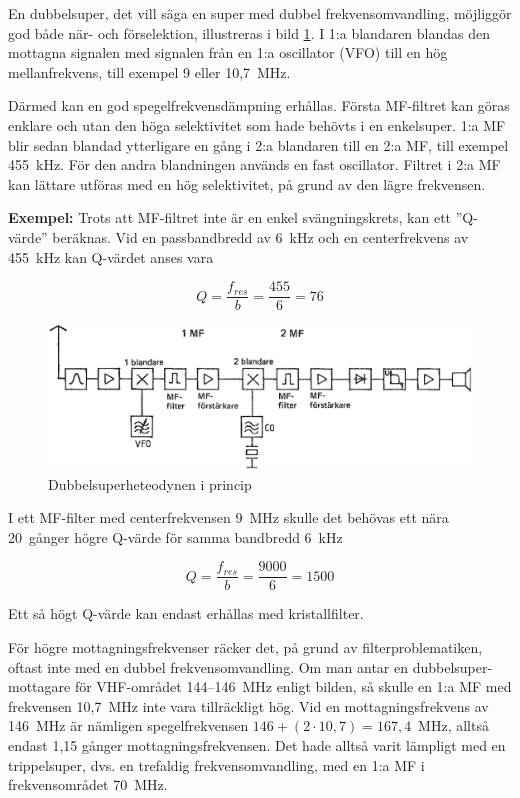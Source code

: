 En dubbelsuper, det vill säga en super med dubbel frekvensomvandling,
möjliggör god både när- och förselektion, illustreras i bild
\ref{fig:bildII4-14}.
I 1:a blandaren blandas den mottagna signalen med signalen från en
1:a oscillator (VFO) till en hög mellanfrekvens, till exempel 9 eller 10,7~MHz.

Därmed kan en god spegelfrekvensdämpning erhållas.
Första MF-filtret kan göras enklare och utan den höga selektivitet som hade
behövts i en enkelsuper.
1:a MF blir sedan blandad ytterligare en gång i 2:a blandaren till en 2:a MF,
till exempel 455~kHz.
För den andra blandningen används en fast oscillator.
Filtret i 2:a MF kan lättare utföras med en hög selektivitet, på grund av den
lägre frekvensen.

\textbf{Exempel:}
Trots att MF-filtret inte är en enkel svängningskrets, kan ett ''Q-värde''
beräknas.
Vid en passbandbredd av 6~kHz och en centerfrekvens av 455~kHz kan Q-värdet
anses vara

\[ Q = \frac{f_{res}}{b} = \frac{455}{6} = 76 \]

\begin{figure}
  \includegraphics[width=\textwidth]{images/cropped_pdfs/bild_2_4-14.pdf}
  \caption{Dubbelsuperheteodynen i princip}
  \label{fig:bildII4-14}
\end{figure}

I ett MF-filter med centerfrekvensen 9~MHz skulle det behövas ett nära
20~gånger högre Q-värde för samma bandbredd 6~kHz

\[ Q = \frac{f_{res}}{b} = \frac{9000}{6} = 1500 \]

Ett så högt Q-värde kan endast erhållas med kristallfilter.

För högre mottagningsfrekvenser räcker det, på grund av filterproblematiken,
oftast inte med en dubbel frekvensomvandling.
Om man antar en dubbelsuper-mottagare för VHF-området 144--146~MHz enligt
bilden, så skulle en 1:a MF med frekvensen 10,7~MHz inte vara tillräckligt hög.
Vid en mottagningsfrekvens av 146~MHz är nämligen spegelfrekvensen
\(146 + (2 \cdot 10,7) = 167,4\)~MHz, alltså endast 1,15 gånger
mottagningsfrekvensen.
Det hade alltså varit lämpligt med en trippelsuper, dvs. en trefaldig
frekvensomvandling, med en 1:a MF i frekvensområdet 70~MHz.
